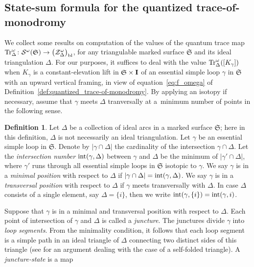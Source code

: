 \documentclass[10pt,a4paper]{amsart}
\numberwithin{equation}{section}
\theoremstyle{definition}
\newtheorem{Definition}[Theorem]{Definition}
\begin{document}
\subsection{State-sum formula for the quantized trace-of-monodromy}
\label{subsec:state-sum}
We collect some results on computation of the values of the quantum trace map ${\rm Tr}^\omega_\Delta \colon \mathcal{S}^\omega(\mathfrak{S}) \to \bigl(\mathcal{Z}^\omega_\Delta\bigr)_{\rm bl}$, for any triangulable marked surface $\mathfrak{S}$ and its ideal triangulation $\Delta$. For our purposes, it suffices to deal with the value ${\rm Tr}^\omega_\Delta([K_\gamma])$ when $K_\gamma$ is a constant-elevation lift in $\mathfrak{S} \times {\bf I}$ of an essential simple loop $\gamma$ in $\mathfrak{S}$ with an upward vertical framing, in view of equation~\eqref{eq:f_omega} of Definition~\ref{def:quantized_trace-of-monodromy}. By applying an isotopy if necessary, assume that $\gamma$ meets $\Delta$ tranversally at a~minimum number of points in the following sense.
\begin{Definition}
\label{def:minimal_and_transversal}
Let $\Delta$ be a collection of ideal arcs in a marked surface $\mathfrak{S}$; here in this definition, $\Delta$ is not necessarily an ideal triangulation. Let $\gamma$ be an essential simple loop in $\mathfrak{S}$. Denote by $|\gamma \cap \Delta|$ the cardinality of the intersection $\gamma \cap \Delta$. Let the {\em intersection number} ${\rm int}(\gamma, \Delta)$ between $\gamma$ and $\Delta$ be the minimum of $|\gamma' \cap \Delta|$, where $\gamma'$ runs through all essential simple loops in $\mathfrak{S}$ isotopic to $\gamma$. We say $\gamma$ is in a {\em minimal position} with respect to $\Delta$ if $|\gamma \cap \Delta| = {\rm int}(\gamma,\Delta)$. We say $\gamma$ is in a {\em transversal position} with respect to $\Delta$ if $\gamma$ meets transversally with $\Delta$.
In case $\Delta$ consists of a single element, say $\Delta = \{i\}$, then we write ${\rm int}(\gamma,\{i\}) = {\rm int}(\gamma,i)$.
\end{Definition}
Suppose that $\gamma$ is in a minimal and transversal position with respect to $\Delta$. Each point of intersection of $\gamma$ and $\Delta$ is called a {\em juncture}. The junctures divide $\gamma$ into {\em loop segments}. From the minimality condition, it follows that each loop segment is a simple path in an ideal triangle of $\Delta$ connecting two distinct sides of this triangle (see \cite[Lemma~2.8]{CKKO} for an argument dealing with the case of a self-folded triangle). A {\em juncture-state} is a map
\end{document}
